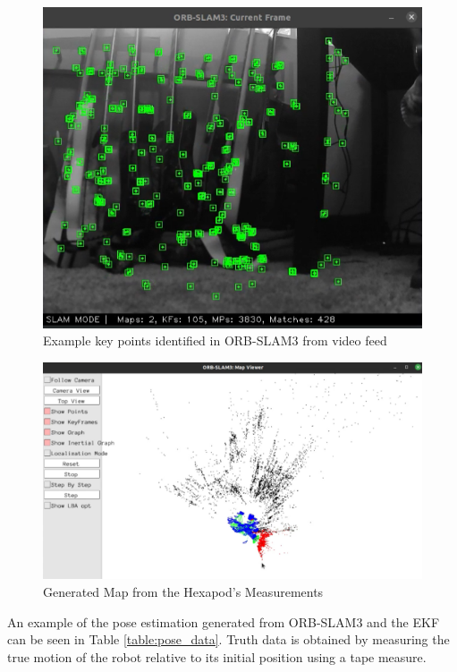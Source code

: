 \documentclass[twocolumn]{article}
\begin{document}
\begin{figure}[h]
    \centering
    \includegraphics[scale=0.4]{figures/orb_slam3_keypoints.png}
    \caption{Example key points identified in ORB-SLAM3 from video feed}
    \label{fig:keypoints}
\end{figure}

\begin{figure}[h]
    \centering
    \includegraphics[scale=0.24]{figures/orb_slam3_map.png}
    \caption{ Generated Map from the Hexapod's Measurements}
    \label{fig:map}
\end{figure}

An example of the pose estimation generated from ORB-SLAM3 and the EKF can be seen in Table \ref{table:pose_data}. Truth data is obtained by measuring the true motion of the robot relative to its initial position using a tape measure. 
\end{document}
